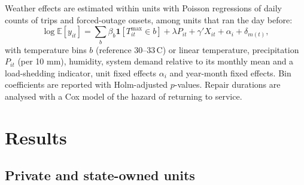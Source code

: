 \documentclass[11pt]{article}
\begin{document}
Weather effects are estimated within units with Poisson regressions of daily counts of trips and forced-outage onsets, among units that ran the day before:
\begin{equation}
\log \mathbb{E}[y_{it}] = \sum_{b} \beta_b \mathbf{1}[T^{\max}_{it}\in b] + \lambda P_{it} + \gamma' X_{it} + \alpha_i + \delta_{m(t)},
\end{equation}
with temperature bins $b$ (reference 30--33\,\textdegree C) or linear temperature, precipitation $P_{it}$ (per 10 mm), humidity, system demand relative to its monthly mean and a load-shedding indicator, unit fixed effects $\alpha_i$ and year-month fixed effects. Bin coefficients are reported with Holm-adjusted $p$-values. Repair durations are analysed with a Cox model of the hazard of returning to service.

\section{Results}

\subsection{Private and state-owned units}
\end{document}
